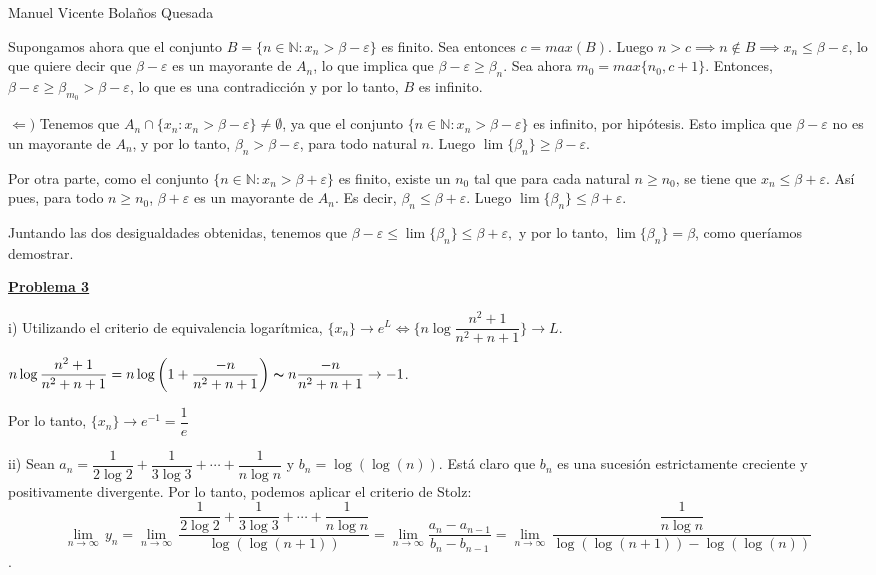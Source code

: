 \documentclass[10pt,a4paper]{article}
\begin{document}
	\newpage
	
	Manuel Vicente Bolaños Quesada \newline
	
	Supongamos ahora que el conjunto $B = \{n \in \mathbb{N}: x_n > \beta - \varepsilon\}$ es finito. Sea entonces $c = max(B)$. Luego $n > c \implies n \notin B \implies x_n \leq \beta - \varepsilon$, lo que quiere decir que $\beta - \varepsilon$ es un mayorante de $A_n$, lo que implica que $\beta - \varepsilon \geq \beta_n$. Sea ahora $m_0 = max\{n_0, c + 1\}$. Entonces, $\beta - \varepsilon \geq \beta_{m_0} > \beta - \varepsilon$, lo que es una contradicción y por lo tanto, $B$ es infinito.
	
	$\Leftarrow )$ Tenemos que $A_n \cap \{x_n : x_n > \beta - \varepsilon\} \neq \emptyset$, ya que el conjunto $\{n \in \mathbb{N}: x_n > \beta- \varepsilon\}$ es infinito, por hipótesis. Esto implica que $\beta - \varepsilon$ no es un mayorante de $A_n$, y por lo tanto, $\beta_n > \beta - \varepsilon$, para todo natural $n$. Luego $\lim\{\beta_n\} \geq \beta - \varepsilon$.
	
	Por otra parte, como el conjunto $\{n \in \mathbb{N}: x_n > \beta + \varepsilon\}$ es finito, existe un $n_0$ tal que para cada natural $n \geq n_0$, se tiene que $x_n \leq \beta + \varepsilon$. Así pues, para todo $n \geq n_0$, $\beta + \varepsilon$ es un mayorante de $A_n$. Es decir, $\beta_n \leq \beta + \varepsilon$. Luego $\lim\{\beta_n\} \leq \beta + \varepsilon$.
	
	Juntando las dos desigualdades obtenidas, tenemos que $ \beta - \varepsilon \leq \lim\{\beta_n\} \leq \beta + \varepsilon,$ y por lo tanto, $\lim\{\beta_n\} = \beta$, como queríamos demostrar. \newline
	
	

	

	
	\begin{flushleft}
		\textbf{\underline{Problema 3}}
	\end{flushleft}	

	i) Utilizando el criterio de equivalencia logarítmica, $\{x_n\} \rightarrow e ^L \Leftrightarrow \{n \log\dfrac{n^2+1}{n^2+n+1}\} \rightarrow L$.
	
	$n \log\dfrac{n^2+1}{n^2+n+1} = n \log \left( 1 + \dfrac{-n}{n^2+n+1} \right) \thicksim n \dfrac{-n}{n^2+n+1} \rightarrow -1$. 
	
	Por lo tanto, $\{x_n\} \rightarrow e ^{-1} = \dfrac{1}{e}$
	
	ii) Sean $a_n = \dfrac{1}{2 \log 2} + \dfrac{1}{3\log 3} + \cdots + \dfrac{1}{n \log n}$ y $b_n = \log (\log (n))$. Está claro que $b_n$ es una sucesión estrictamente creciente y positivamente divergente. Por lo tanto, podemos aplicar el criterio de Stolz:
	$$\underset{n\to \infty }{\mathop{\lim }}\,{{y}_{n}}=\underset{n\to \infty }{\mathop{\lim }}\,\dfrac{\dfrac{1}{2\log 2}+\dfrac{1}{3\log 3}+\cdots +\dfrac{1}{n\log n}}{\log (\log (n+1))}=\underset{n\to \infty }{\mathop{\lim }}\dfrac{a_n-a_{n-1}}{b_n-b_{n-1}} = \underset{n\to \infty }{\mathop{\lim }}\,\frac{\dfrac{1}{n\log n}}{\log (\log (n+1))-\log(\log(n))}$$.
	
\end{document}

